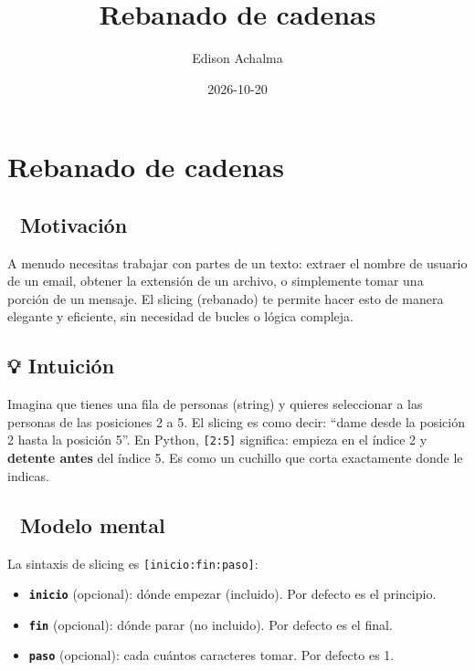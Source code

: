 \documentclass[
  doc,
  floatsintext,
  longtable,
  a4paper,
  nolmodern,
  notxfonts,
  notimes,
  12pt,
  colorlinks=true,linkcolor=blue,citecolor=blue,urlcolor=blue]{apa7}
\title{Rebanado de cadenas}
\author{Edison Achalma}
\affiliation{
{Escuela Profesional de Economía, Universidad Nacional de San Cristóbal
de Huamanga}}
\date{2026-10-20}
\providecommand{\tightlist}{%
  \setlength{\itemsep}{0pt}\setlength{\parskip}{0pt}}
\begin{document}
\maketitle


\hypertarget{toc}{}
\tableofcontents
\newpage
\section[Introduction]{Rebanado de cadenas}

\setcounter{secnumdepth}{3}

\setlength\LTleft{0pt}




\subsection{🎯 Motivación}\label{motivaciuxf3n}

A menudo necesitas trabajar con partes de un texto: extraer el nombre de
usuario de un email, obtener la extensión de un archivo, o simplemente
tomar una porción de un mensaje. El slicing (rebanado) te permite hacer
esto de manera elegante y eficiente, sin necesidad de bucles o lógica
compleja.

\subsection{💡 Intuición}\label{intuiciuxf3n}

Imagina que tienes una fila de personas (string) y quieres seleccionar a
las personas de las posiciones 2 a 5. El slicing es como decir: ``dame
desde la posición 2 hasta la posición 5''. En Python, \texttt{{[}2:5{]}}
significa: empieza en el índice 2 y \textbf{detente antes} del índice 5.
Es como un cuchillo que corta exactamente donde le indicas.

\subsection{🧠 Modelo mental}\label{modelo-mental}

La sintaxis de slicing es \texttt{{[}inicio:fin:paso{]}}:

\begin{itemize}
\tightlist
\item
  \textbf{\texttt{inicio}} (opcional): dónde empezar (incluido). Por
  defecto es el principio.
\item
  \textbf{\texttt{fin}} (opcional): dónde parar (no incluido). Por
  defecto es el final.
\item
  \textbf{\texttt{paso}} (opcional): cada cuántos caracteres tomar. Por
  defecto es 1.
\end{itemize}
\end{document}
